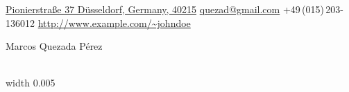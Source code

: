\documentclass[letterpaper,MMMyyyy,nonstopmode]{resumecv}
\newcommand{\CVAuthor}{Marcos Quezada Pérez}
\newcommand{\CVWebpage}{http://www.example.com/~johndoe}
\begin{document}

\begin{adjustbox}{minipage=0.25\fboxrule,cfbox=teal 3pt}\raggedright\UseSubTitleFont
\href{https://goo.gl/maps/dR9owVqLbk22}
{Pionierstraße 37\newline
Düsseldorf, Germany, 40215}\newline
\href{mailto:quezad@gmail.com}
{quezad@gmail.com}\newline
+49\,(015)\,203-136012\newline
\href{\CVWebpage}
{\url{\CVWebpage}}
\end{adjustbox}
\begin{minipage}{0.75\textwidth\raggedleft\UseTitleFont}\raggedleft
\CVAuthor
\end{minipage}
\\[-2]
\hfill{\color{teal}\vline width 0.005\textwidth}\hfill
\begin{minipage}{0.995\textwidth\raggedright}
\BigGap
\lipsum
\end{minipage}
\end{document}

